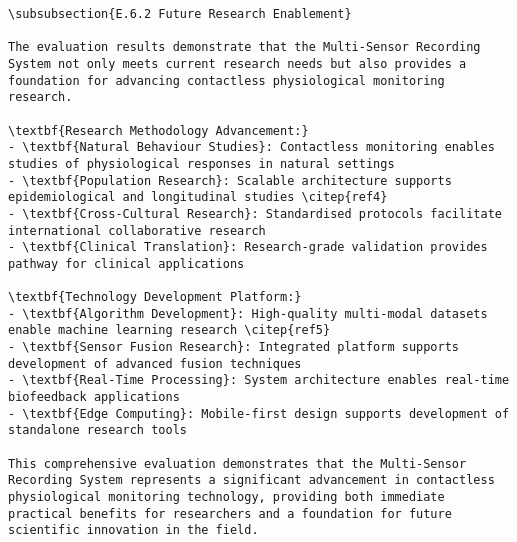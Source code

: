 \begin{verbatim}
\subsubsection{E.6.2 Future Research Enablement}

The evaluation results demonstrate that the Multi-Sensor Recording System not only meets current research needs but also provides a foundation for advancing contactless physiological monitoring research.

\textbf{Research Methodology Advancement:}
- \textbf{Natural Behaviour Studies}: Contactless monitoring enables studies of physiological responses in natural settings
- \textbf{Population Research}: Scalable architecture supports epidemiological and longitudinal studies \citep{ref4}
- \textbf{Cross-Cultural Research}: Standardised protocols facilitate international collaborative research
- \textbf{Clinical Translation}: Research-grade validation provides pathway for clinical applications

\textbf{Technology Development Platform:}
- \textbf{Algorithm Development}: High-quality multi-modal datasets enable machine learning research \citep{ref5}
- \textbf{Sensor Fusion Research}: Integrated platform supports development of advanced fusion techniques
- \textbf{Real-Time Processing}: System architecture enables real-time biofeedback applications
- \textbf{Edge Computing}: Mobile-first design supports development of standalone research tools

This comprehensive evaluation demonstrates that the Multi-Sensor Recording System represents a significant advancement in contactless physiological monitoring technology, providing both immediate practical benefits for researchers and a foundation for future scientific innovation in the field.
\end{verbatim}
